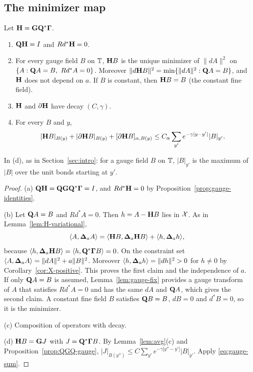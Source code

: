 \subsection{The minimizer map}\label{ss:11.3}

\begin{theorem}\label{thm:H-gauge}
Let $\mathbf H=\mathbf G\mathbf Q^*\boldsymbol\Gamma$.
\begin{enumerate}[label=(\alph*)]
\item $\mathbf Q\mathbf H=I$ and $Rd^*\mathbf H=0$.
\item For every gauge field $B$ on $\mathbb T$, $\mathbf H B$ is the unique minimizer of $\|dA\|^2$ on $\{A:\mathbf Q A=B,\ Rd^*A=0\}$. Moreover $\|d\mathbf H B\|^2=\min\{\|dA\|^2:\mathbf Q A=B\}$, and $\mathbf H$ does not depend on $a$. If $B$ is constant, then $\mathbf H B=B$ (the constant fine field).
\item $\mathbf H$ and $\partial\mathbf H$ have decay $(C,\gamma)$.
\item For every $B$ and $y$,
\[
|\mathbf H B|_{B(y)}+|\partial\mathbf H B|_{B(y)}+[\partial\mathbf H B]_{\alpha,B(y)}\le C_\alpha\sum_{y'}e^{-\gamma|y-y'|}|B|_{y'} .
\]
\end{enumerate}
\end{theorem}

In (d), as in Section~\ref{sec:intro}: for a gauge field $B$ on $\mathbb T$, $|B|_{y'}$ is the maximum of $|B|$ over the unit bonds starting at $y'$.

\begin{proof}
(a) $\mathbf Q\mathbf H=\mathbf Q\mathbf G\mathbf Q^*\boldsymbol\Gamma=I$, and $Rd^*\mathbf H=0$ by Proposition~\ref{prop:gauge-identities}.

(b) Let $\mathbf Q A=B$ and $Rd^*A=0$. Then $h=A-\mathbf H B$ lies in $\mathcal X$. As in Lemma~\ref{lem:H-variational},
\[
\langle A,\boldsymbol{\Delta}_aA\rangle=\langle \mathbf H B,\boldsymbol{\Delta}_a\mathbf H B\rangle+\langle h,\boldsymbol{\Delta}_ah\rangle,
\]
because $\langle h,\boldsymbol{\Delta}_a\mathbf H B\rangle=\langle h,\mathbf Q^*\boldsymbol\Gamma B\rangle=0$. On the constraint set $\langle A,\boldsymbol{\Delta}_aA\rangle=\|dA\|^2+a\|B\|^2$. Moreover $\langle h,\boldsymbol{\Delta}_ah\rangle=\|dh\|^2>0$ for $h\ne0$ by Corollary~\ref{cor:X-positive}. This proves the first claim and the independence of $a$. If only $\mathbf Q A=B$ is assumed, Lemma~\ref{lem:gauge-fix} provides a gauge transform of $A$ that satisfies $Rd^*A=0$ and has the same $dA$ and $\mathbf Q A$, which gives the second claim. A constant fine field $B$ satisfies $\mathbf Q B=B$, $dB=0$ and $d^*B=0$, so it is the minimizer.

(c) Composition of operators with decay.

(d) $\mathbf H B=\mathbf G J$ with $J=\mathbf Q^*\boldsymbol\Gamma B$. By Lemma~\ref{lem:avg}(c) and Proposition~\ref{prop:QGQ-gauge}, $|J|_{B(y'')}\le C\sum_{y'}e^{-\gamma|y''-y'|}|B|_{y'}$. Apply \eqref{eq:gauge-sum}.
\end{proof}

